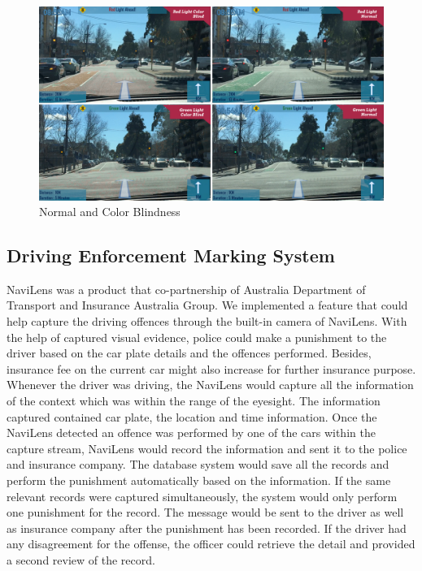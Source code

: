 \documentclass{chi-ext}
\begin{document}
\begin{multicols}{2}
\begin{figure}
 \includegraphics[width=\columnwidth]{colorblindess.png}
 \caption{Normal and Color Blindness}
 \label{fig:colorblindess}
\end{figure}

\subsection{Driving Enforcement Marking System}

NaviLens was a product that co-partnership of Australia Department of Transport and Insurance Australia Group. We implemented a feature that could help capture the driving offences through the built-in camera of NaviLens. With the help of captured visual evidence, police could make a punishment to the driver based on the car plate details and the offences performed. Besides, insurance fee on the current car might also increase for further insurance purpose.\\

Whenever the driver was driving, the NaviLens would capture all the information of the context which was within the range of the eyesight. The information captured contained car plate, the location and time information. Once the NaviLens detected an offence was performed by one of the cars within the capture stream, NaviLens would record the information and sent it to the police and insurance company. The database system would save all the records and perform the punishment automatically based on the information. If the same relevant records were captured simultaneously, the system would only perform one punishment for the record. The message would be sent to the driver as well as insurance company after the punishment has been recorded. If the driver had any disagreement for the offense, the officer could retrieve the detail and provided a second review of the record.\\



\end{multicols}
\end{document}
